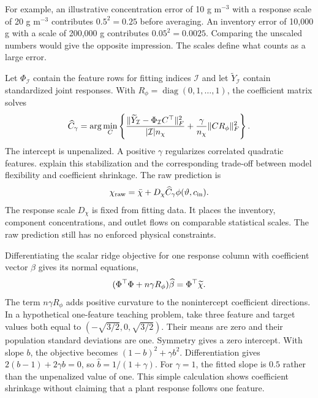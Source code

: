 For example, an illustrative concentration error of 10 g m$^{-3}$ with a response scale of 20 g m$^{-3}$ contributes $0.5^2=0.25$ before averaging. An inventory error of 10{,}000 g with a scale of 200{,}000 g contributes $0.05^2=0.0025$. Comparing the unscaled numbers would give the opposite impression. The scales define what counts as a large error.

Let $\Phi_{\mathcal I}$ contain the feature rows for fitting indices $\mathcal I$ and let $\widetilde Y_{\mathcal I}$ contain standardized joint responses. With $R_\phi=\operatorname{diag}(0,1,\ldots,1)$, the coefficient matrix solves
\begin{equation}
\equationname{Matrix form of the multiresponse ridge fitting problem}
\widehat C_\gamma=\arg\min_C
\left\{\frac{\|\widetilde Y_{\mathcal I}-\Phi_{\mathcal I}C^\top\|_F^2}
{|\mathcal I|n_\chi}+\frac{\gamma}{n_\chi}\|CR_\phi\|_F^2\right\}.
\label{eq:plant_ridge_fit}
\end{equation}
The intercept is unpenalized. A positive $\gamma$ regularizes correlated quadratic features. \citet{Hastie2009} explain this stabilization and the corresponding trade-off between model flexibility and coefficient shrinkage. The raw prediction is
\begin{equation}
\equationname{Raw joint plant prediction on the physical response scale}
\chi_{\rm raw}=\bar\chi+D_\chi\widehat C_\gamma\phi(\vartheta,c_{\rm in}).
\label{eq:plant_raw_prediction}
\end{equation}
The response scale $D_\chi$ is fixed from fitting data. It places the inventory, component concentrations, and outlet flows on comparable statistical scales. The raw prediction still has no enforced physical constraints.

Differentiating the scalar ridge objective for one response column with coefficient vector $\beta$ gives its normal equations,
\begin{equation}
\equationname{Normal equations for one ridge response coordinate}
(\Phi^\top\Phi+n\gamma R_\phi)\widehat\beta=\Phi^\top\widetilde\chi.
\end{equation}
The term $n\gamma R_\phi$ adds positive curvature to the nonintercept coefficient directions. In a hypothetical one-feature teaching problem, take three feature and target values both equal to $(-\sqrt{3/2},0,\sqrt{3/2})$. Their means are zero and their population standard deviations are one. Symmetry gives a zero intercept. With slope $b$, the objective becomes $(1-b)^2+\gamma b^2$. Differentiation gives $2(b-1)+2\gamma b=0$, so $\widehat b=1/(1+\gamma)$. For $\gamma=1$, the fitted slope is $0.5$ rather than the unpenalized value of one. This simple calculation shows coefficient shrinkage without claiming that a plant response follows one feature.

